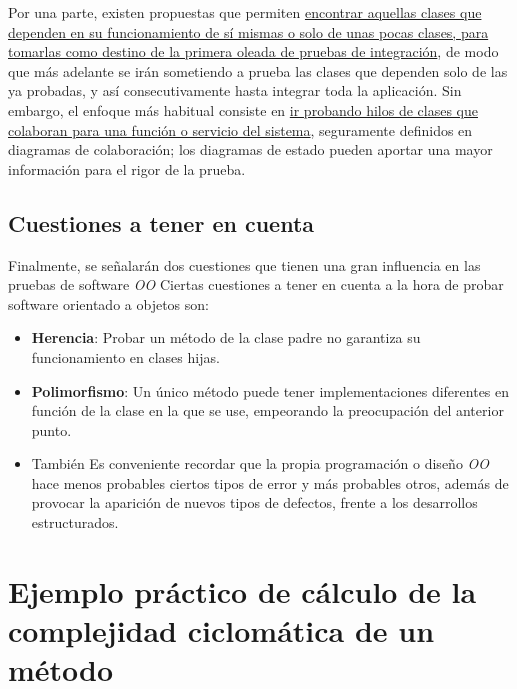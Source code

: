Por una parte, existen propuestas que permiten \uline{encontrar aquellas clases que dependen en su funcionamiento de sí mismas o solo de unas pocas clases, para tomarlas como destino de la primera oleada de pruebas de integración}, de modo que más adelante se irán sometiendo a prueba las clases que dependen solo de las ya probadas, y así consecutivamente hasta integrar toda la aplicación. Sin embargo, el enfoque más habitual consiste en \uline{ir probando hilos de clases que colaboran para una función o servicio del sistema}, seguramente definidos en diagramas de colaboración; los diagramas de estado pueden aportar una mayor información para el rigor de la prueba.

\subsection{Cuestiones a tener en cuenta}

Finalmente, se señalarán dos cuestiones que tienen una gran influencia en las pruebas de software \textit{OO}
Ciertas cuestiones a tener en cuenta a la hora de probar software orientado a objetos son:
\begin{itemize}
    \item \textbf{Herencia}: Probar un método de la clase padre no garantiza su funcionamiento en clases hijas.
    \item \textbf{Polimorfismo}: Un único método puede tener implementaciones diferentes en función de la clase en la que se use, empeorando la preocupación del anterior punto.
    \item También Es conveniente recordar que la propia programación o diseño \textit{OO} hace menos probables ciertos tipos de error y más probables otros, además de provocar la aparición de nuevos tipos de defectos, frente a los desarrollos estructurados.
\end{itemize}

\newpage
\section{Ejemplo práctico de cálculo de la complejidad ciclomática de un método}

